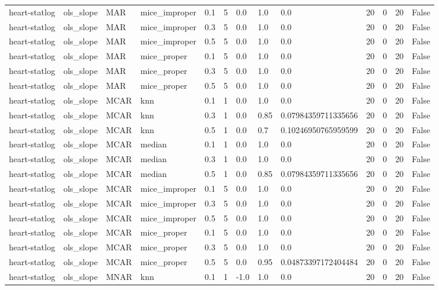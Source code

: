 \begin{tabular}{lllllllllllll}
heart-statlog & ols\_slope & MAR & mice\_improper & 0.1 & 5 & 0.0 & 1.0 & 0.0 & 20 & 0 & 20 & False \\
heart-statlog & ols\_slope & MAR & mice\_improper & 0.3 & 5 & 0.0 & 1.0 & 0.0 & 20 & 0 & 20 & False \\
heart-statlog & ols\_slope & MAR & mice\_improper & 0.5 & 5 & 0.0 & 1.0 & 0.0 & 20 & 0 & 20 & False \\
heart-statlog & ols\_slope & MAR & mice\_proper & 0.1 & 5 & 0.0 & 1.0 & 0.0 & 20 & 0 & 20 & False \\
heart-statlog & ols\_slope & MAR & mice\_proper & 0.3 & 5 & 0.0 & 1.0 & 0.0 & 20 & 0 & 20 & False \\
heart-statlog & ols\_slope & MAR & mice\_proper & 0.5 & 5 & 0.0 & 1.0 & 0.0 & 20 & 0 & 20 & False \\
heart-statlog & ols\_slope & MCAR & knn & 0.1 & 1 & 0.0 & 1.0 & 0.0 & 20 & 0 & 20 & False \\
heart-statlog & ols\_slope & MCAR & knn & 0.3 & 1 & 0.0 & 0.85 & 0.07984359711335656 & 20 & 0 & 20 & False \\
heart-statlog & ols\_slope & MCAR & knn & 0.5 & 1 & 0.0 & 0.7 & 0.10246950765959599 & 20 & 0 & 20 & False \\
heart-statlog & ols\_slope & MCAR & median & 0.1 & 1 & 0.0 & 1.0 & 0.0 & 20 & 0 & 20 & False \\
heart-statlog & ols\_slope & MCAR & median & 0.3 & 1 & 0.0 & 1.0 & 0.0 & 20 & 0 & 20 & False \\
heart-statlog & ols\_slope & MCAR & median & 0.5 & 1 & 0.0 & 0.85 & 0.07984359711335656 & 20 & 0 & 20 & False \\
heart-statlog & ols\_slope & MCAR & mice\_improper & 0.1 & 5 & 0.0 & 1.0 & 0.0 & 20 & 0 & 20 & False \\
heart-statlog & ols\_slope & MCAR & mice\_improper & 0.3 & 5 & 0.0 & 1.0 & 0.0 & 20 & 0 & 20 & False \\
heart-statlog & ols\_slope & MCAR & mice\_improper & 0.5 & 5 & 0.0 & 1.0 & 0.0 & 20 & 0 & 20 & False \\
heart-statlog & ols\_slope & MCAR & mice\_proper & 0.1 & 5 & 0.0 & 1.0 & 0.0 & 20 & 0 & 20 & False \\
heart-statlog & ols\_slope & MCAR & mice\_proper & 0.3 & 5 & 0.0 & 1.0 & 0.0 & 20 & 0 & 20 & False \\
heart-statlog & ols\_slope & MCAR & mice\_proper & 0.5 & 5 & 0.0 & 0.95 & 0.04873397172404484 & 20 & 0 & 20 & False \\
heart-statlog & ols\_slope & MNAR & knn & 0.1 & 1 & -1.0 & 1.0 & 0.0 & 20 & 0 & 20 & False \\

\end{tabular}
